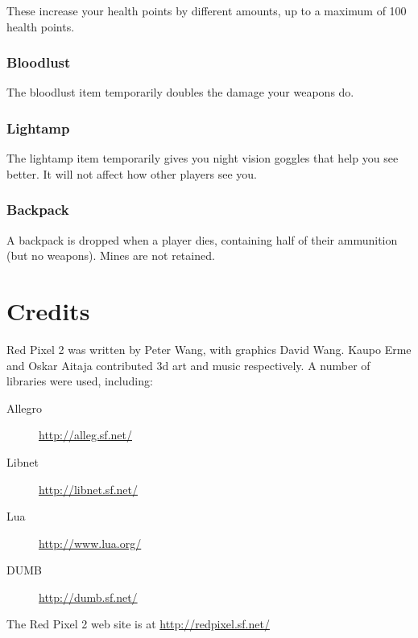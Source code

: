 \documentclass[a4paper,titlepage]{article}
\begin{document}
These increase your health points by different amounts, up to a
maximum of 100 health points.

\subsubsection*{Bloodlust}

The bloodlust item temporarily doubles the damage your weapons do.

\subsubsection*{Lightamp}

The lightamp item temporarily gives you night vision goggles that help
you see better.  It will not affect how other players see you.

\subsubsection*{Backpack}

A backpack is dropped when a player dies, containing half of their
ammunition (but no weapons).  Mines are not retained.



\section{Credits}

Red Pixel 2 was written by Peter Wang, with graphics David Wang.
Kaupo Erme and Oskar Aitaja contributed 3d art and music respectively.
A number of libraries were used, including:

\begin{description}
\item [Allegro] \url{http://alleg.sf.net/}
\item [Libnet] \url{http://libnet.sf.net/}
\item [Lua] \url{http://www.lua.org/}
\item [DUMB] \url{http://dumb.sf.net/}
\end{description}

\noindent
The Red Pixel 2 web site is at \url{http://redpixel.sf.net/}
\end{document}
